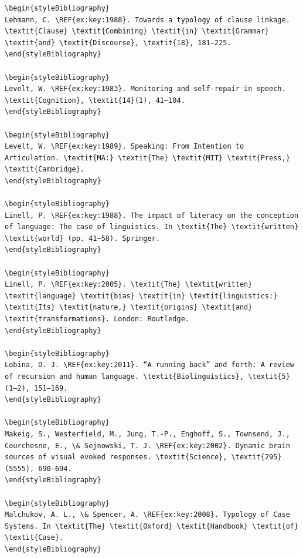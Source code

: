 \begin{verbatim}
\begin{styleBibliography}
Lehmann, C. \REF{ex:key:1988}. Towards a typology of clause linkage. \textit{Clause} \textit{Combining} \textit{in} \textit{Grammar} \textit{and} \textit{Discourse}, \textit{18}, 181–225.
\end{styleBibliography}

\begin{styleBibliography}
Levelt, W. \REF{ex:key:1983}. Monitoring and self-repair in speech. \textit{Cognition}, \textit{14}(1), 41–104.
\end{styleBibliography}

\begin{styleBibliography}
Levelt, W. \REF{ex:key:1989}. Speaking: From Intention to Articulation. \textit{MA:} \textit{The} \textit{MIT} \textit{Press,} \textit{Cambridge}.
\end{styleBibliography}

\begin{styleBibliography}
Linell, P. \REF{ex:key:1988}. The impact of literacy on the conception of language: The case of linguistics. In \textit{The} \textit{written} \textit{world} (pp. 41–58). Springer.
\end{styleBibliography}

\begin{styleBibliography}
Linell, P. \REF{ex:key:2005}. \textit{The} \textit{written} \textit{language} \textit{bias} \textit{in} \textit{linguistics:} \textit{Its} \textit{nature,} \textit{origins} \textit{and} \textit{transformations}. London: Routledge.
\end{styleBibliography}

\begin{styleBibliography}
Lobina, D. J. \REF{ex:key:2011}. “A running back” and forth: A review of recursion and human language. \textit{Biolinguistics}, \textit{5}(1–2), 151–169.
\end{styleBibliography}

\begin{styleBibliography}
Makeig, S., Westerfield, M., Jung, T.-P., Enghoff, S., Townsend, J., Courchesne, E., \& Sejnowski, T. J. \REF{ex:key:2002}. Dynamic brain sources of visual evoked responses. \textit{Science}, \textit{295}(5555), 690–694.
\end{styleBibliography}

\begin{styleBibliography}
Malchukov, A. L., \& Spencer, A. \REF{ex:key:2008}. Typology of Case Systems. In \textit{The} \textit{Oxford} \textit{Handbook} \textit{of} \textit{Case}.
\end{styleBibliography}


\end{verbatim}
